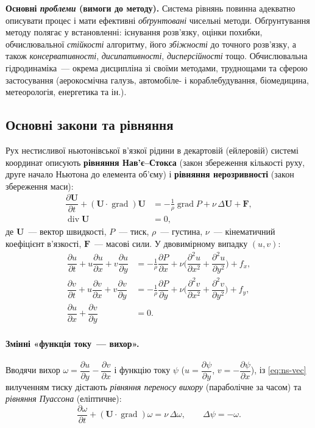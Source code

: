 \documentclass[12pt,a4paper]{article}
\theoremstyle{definition}
\theoremstyle{plain}
\newcommand{\dd}[2]{\dfrac{\partial #1}{\partial #2}}
\newcommand{\ddt}[1]{\dfrac{\partial #1}{\partial t}}
\newcommand{\ddx}[1]{\dfrac{\partial #1}{\partial x}}
\newcommand{\ddxx}[1]{\dfrac{\partial^2 #1}{\partial x^2}}
\DeclareMathOperator{\divv}{div}
\DeclareMathOperator{\grad}{grad}
\begin{document}
\smallskip\noindent\textbf{Основні \emph{проблеми} (вимоги до методу).}
Система рівнянь повинна адекватно описувати процес і мати ефективні
\emph{обґрунтовані} чисельні методи. Обґрунтування методу полягає у
встановленні: існування розв'язку, оцінки похибки, обчислювальної
\emph{стійкості} алгоритму, його \emph{збіжності} до точного розв'язку,
а також \emph{консервативності}, \emph{дисипативності},
\emph{дисперсійності} тощо. Обчислювальна гідродинаміка~--- окрема
дисципліна зі своїми методами, труднощами та сферою застосування
(аерокосмічна галузь, автомобіле- і кораблебудування, біомедицина,
метеорологія, енергетика та ін.).

\subsection{Основні закони та рівняння}
Рух нестисливої ньютонівської в'язкої рідини в декартовій (ейлеровій)
системі координат описують \textbf{рівняння Нав'є--Стокса} (закон
збереження кількості руху, друге начало Ньютона до елемента об'єму) і
\textbf{рівняння нерозривності} (закон збереження маси):
\begin{align}
  \ddt{\mathbf{U}} + (\mathbf{U}\cdot\grad)\mathbf{U}
    &= -\frac{1}{\rho}\grad P + \nu\,\Delta\mathbf{U} + \mathbf{F}, \label{eq:ns-vec}\\
  \divv \mathbf{U} &= 0, \label{eq:cont}
\end{align}
де $\mathbf{U}$~--- вектор швидкості, $P$~--- тиск, $\rho$~--- густина,
$\nu$~--- кінематичний коефіцієнт в'язкості, $\mathbf{F}$~--- масові
сили. У двовимірному випадку $(u,v)$:
\begin{align}
  \ddt{u}+u\ddx{u}+v\dd{u}{y} &= -\frac1\rho\ddx{P}
     +\nu\Big(\ddxx{u}+\dd{^2 u}{y^2}\Big)+f_x,\\
  \ddt{v}+u\ddx{v}+v\dd{v}{y} &= -\frac1\rho\dd{P}{y}
     +\nu\Big(\ddxx{v}+\dd{^2 v}{y^2}\Big)+f_y,\\
  \ddx{u}+\dd{v}{y} &= 0 .
\end{align}

\paragraph{Змінні «функція току~--- вихор».} Вводячи вихор
$\omega=\dd{u}{y}-\ddx{v}$ і функцію току $\psi$ ($u=\dd{\psi}{y}$,
$v=-\ddx{\psi}$), із \eqref{eq:ns-vec} вилученням тиску дістають
\emph{рівняння переносу вихору} (параболічне за часом) та
\emph{рівняння Пуассона} (еліптичне):
\begin{equation}
  \ddt{\omega}+(\mathbf{U}\cdot\grad)\omega=\nu\,\Delta\omega,
  \qquad \Delta\psi=-\omega .
  \label{eq:vort}
\end{equation}
\end{document}
